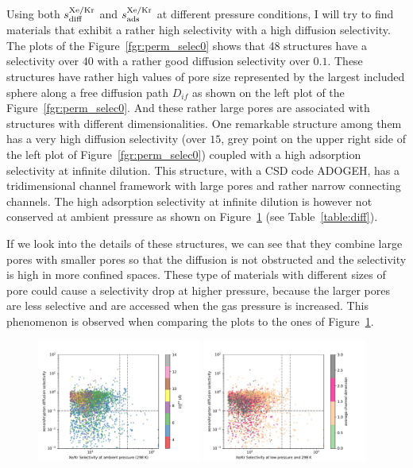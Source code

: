 \documentclass[main]{subfiles}
\begin{document}
Using both $s^{\text{Xe/Kr}}_{\text{diff}}$ and $s^{\text{Xe/Kr}}_{\text{ads}}$ at different pressure conditions, I will try to find materials that exhibit a rather high selectivity with a high diffusion selectivity. The plots of the Figure~\ref{fgr:perm_selec0} shows that 48 structures have a selectivity over $40$ with a rather good diffusion selectivity over $0.1$. These structures have rather high values of pore size represented by the largest included sphere along a free diffusion path $D_{if}$ as shown on the left plot of the Figure~\ref{fgr:perm_selec0}. And these rather large pores are associated with structures with different dimensionalities.
One remarkable structure among them has a very high diffusion selectivity (over $15$, grey point on the upper right side of the left plot of Figure~\ref{fgr:perm_selec0}) coupled with a high adsorption selectivity at infinite dilution. This structure, with a CSD code ADOGEH\cite{Peikert_2012}, has a tridimensional channel framework with large pores and rather narrow connecting channels. The high adsorption selectivity at infinite dilution is however not conserved at ambient pressure as shown on Figure~\ref{fgr:perm_selec2080}  (see Table~\ref{table:diff}).

If we look into the details of these structures, we can see that they combine large pores with smaller pores so that the diffusion is not obstructed and the selectivity is high in more confined spaces. These type of materials with different sizes of pore could cause a selectivity drop at higher pressure, because the larger pores are less selective and are accessed when the gas pressure is increased. This phenomenon is observed when comparing the plots to the ones of Figure~\ref{fgr:perm_selec2080}.

\begin{figure}[ht]
  \centering
    \includegraphics[width=0.48\textwidth]{figures/5-diffusion/diff_D_xekr-s2080-lcd.pdf}
    \includegraphics[width=0.48\textwidth]{figures/5-diffusion/diff_D_xekr-s2080-chandim.pdf}
    \caption{}\label{fgr:perm_selec2080}
\end{figure}
\end{document}
